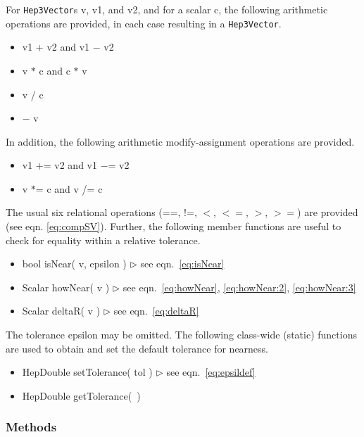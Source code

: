 \documentclass[twoside,12pt]{article}
\def \SV {{\tt Hep3Vector}}
\newcommand {\see}[1] {\hfill$\triangleright$ see eqn.~#1}
\newenvironment{shortlist}{%
\begin{itemize}
\setlength{\itemsep}{0pt}
\setlength{\parskip}{0pt}
}{%
\end{itemize}
}
\begin{document}
For \SV s v, v1, and v2, and for a scalar c,
the following arithmetic operations are provided,
in each case resulting in a \SV .

\begin{shortlist}
  \item v1 + v2  and  v1 $-$ v2
  \item v $*$ c  and  c $*$ v
  \item v / c
  \item $-$ v
\end{shortlist}

\noindent
In addition, 
the following arithmetic modify-assignment operations are provided.

\begin{shortlist}
  \item v1 += v2  and  v1 $-$= v2
  \item v $*$= c  and  v /= c
\end{shortlist}

\noindent
The usual six relational operations
(==, !=, $<$, $<=$, $>$, $>=$) are provided (see eqn. \ref{eq:compSV}).
Further, the following member functions are useful to check for equality
within a relative tolerance.

\begin{shortlist}
  \item bool isNear( v, epsilon ) \see{\ref{eq:isNear}}
  \item Scalar howNear( v ) \see{\ref{eq:howNear}, \ref{eq:howNear:2}, \ref{eq:howNear:3}}
  \item Scalar deltaR( v ) \see{\ref{eq:deltaR}}
\end{shortlist}

\noindent
The tolerance epsilon may be omitted.
The following class-wide (static) functions are used
to obtain and set the default tolerance for nearness.

\begin{shortlist}
  \item HepDouble setTolerance( tol )	\see{\ref{eq:epsildef}}
  \item HepDouble getTolerance(~)
\end{shortlist}


\subsubsection{Methods}
\end{document}
